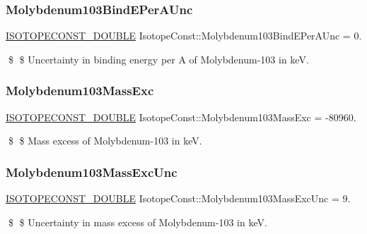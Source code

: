 \subsubsection{\texorpdfstring{Molybdenum103\+Bind\+E\+Per\+A\+Unc}{Molybdenum103BindEPerAUnc}}
{\footnotesize\ttfamily \mbox{\hyperlink{group___isotope_const-_macros_ga8f45a7272ce02c0b4c65c44636ed719a}{I\+S\+O\+T\+O\+P\+E\+C\+O\+N\+S\+T\+\_\+\+D\+O\+U\+B\+LE}} Isotope\+Const\+::\+Molybdenum103\+Bind\+E\+Per\+A\+Unc = 0.}

\$ \$ Uncertainty in binding energy per A of Molybdenum-\/103 in keV. \mbox{\label{group___isotope_const-_molybdenum-_mo103_ga55231214cb3fe03d42d407485a551a5f}} 
\subsubsection{\texorpdfstring{Molybdenum103\+Mass\+Exc}{Molybdenum103MassExc}}
{\footnotesize\ttfamily \mbox{\hyperlink{group___isotope_const-_macros_ga8f45a7272ce02c0b4c65c44636ed719a}{I\+S\+O\+T\+O\+P\+E\+C\+O\+N\+S\+T\+\_\+\+D\+O\+U\+B\+LE}} Isotope\+Const\+::\+Molybdenum103\+Mass\+Exc = -\/80960.}

\$ \$ Mass excess of Molybdenum-\/103 in keV. \mbox{\label{group___isotope_const-_molybdenum-_mo103_gaa1f74c0b14f5da9dac0e78d6e3f5d58b}} 
\subsubsection{\texorpdfstring{Molybdenum103\+Mass\+Exc\+Unc}{Molybdenum103MassExcUnc}}
{\footnotesize\ttfamily \mbox{\hyperlink{group___isotope_const-_macros_ga8f45a7272ce02c0b4c65c44636ed719a}{I\+S\+O\+T\+O\+P\+E\+C\+O\+N\+S\+T\+\_\+\+D\+O\+U\+B\+LE}} Isotope\+Const\+::\+Molybdenum103\+Mass\+Exc\+Unc = 9.}

\$ \$ Uncertainty in mass excess of Molybdenum-\/103 in keV. \mbox{\label{group___isotope_const-_molybdenum-_mo103_gac01f44530a9d59309eb6b41dcf4193d8}} 
